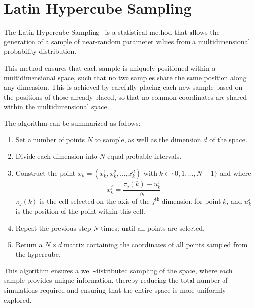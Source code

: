 \chapter{Latin Hypercube Sampling}\label{app:lhs}

The Latin Hypercube Sampling~\cite{eglajs1977new,mckay1979comparison} is a statistical method that allows the generation of a sample of near-random parameter values from a multidimensional probability distribution. 

This method ensures that each sample is uniquely positioned within a multidimensional space, such that no two samples share the same position along any dimension. This is achieved by carefully placing each new sample based on the positions of those already placed, so that no common coordinates are shared within the multidimensional space.

The algorithm can be summarized as follows:

\begin{enumerate}
    \item Set a number of points $N$ to sample, as well as the dimension $d$ of the space.
    \item Divide each dimension into $N$ equal probable intervals.
    \item Construct the point $x_k = (x_k^1, x_k^2, \dots, x_k^d)$ with $k \in \{0, 1, \dots , N-1\}$
    and where $$x_k^j = \frac{\pi_j(k) - u_k^j}{N}$$ $\pi_j(k)$ is the cell selected on the axis of the $j^{\text{th}}$ dimension for point $k$, and $u_k^j$ is the position of the point within this cell.
    \item Repeat the previous step $N$ times; until all points are selected.
    \item Return a $N \times d$ matrix containing the coordinates of all points sampled from the hypercube.
\end{enumerate}

This algorithm ensures a well-distributed sampling of the space, where each sample provides unique information, thereby reducing the total number of simulations required and ensuring that the entire space is more uniformly explored.